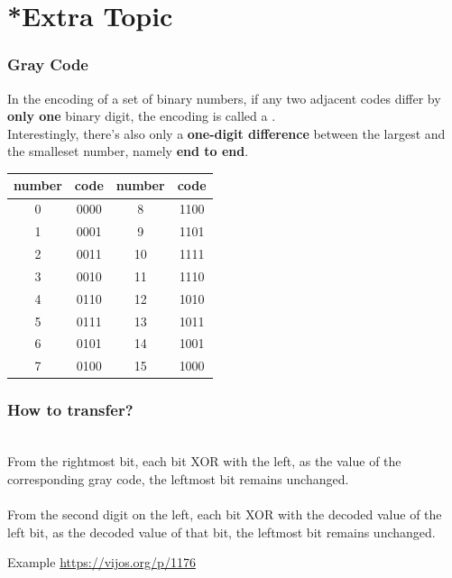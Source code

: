 \documentclass[xcolor=table]{beamer}
\begin{document}
\section{*Extra Topic}
\begin{frame}
    \frametitle{Gray Code}
    \hh
    In the encoding of a set of binary numbers, 
    if any two adjacent codes differ by \textbf{only one} binary digit, 
    the encoding is called a .\\
    \hh Interestingly, there's also only a \textbf{one-digit difference}
     between the largest and the smalleset number, namely \textbf{end to end}.
     \begin{table}[]
        \begin{tabular}{|c|c|c|c|}
        \toprule
        number & code & number & code \\ 
        \midrule
        0 & 0000 & 8 & 1100 \\ \hline
        1 & 0001 & 9 & 1101 \\ \hline
        2 & 0011 & 10 & 1111 \\ \hline
        3 & 0010 & 11 & 1110 \\ \hline
        4 & 0110 & 12 & 1010 \\ \hline
        5 & 0111 & 13 & 1011 \\ \hline
        6 & 0101 & 14 & 1001 \\ \hline
        7 & 0100 & 15 & 1000 \\ 
        \bottomrule
        \end{tabular}
        \end{table}
\end{frame}
\begin{frame}
    \frametitle{How to transfer?}
     \\
    \hh From the rightmost bit, each bit XOR with the left, as the value of the corresponding gray code, 
    the leftmost bit remains unchanged.
    \\
    \vv 
     \\
    \hh From the second digit on the left, each bit XOR with the decoded value of the left bit,
     as the decoded value of that bit, the leftmost bit remains unchanged.  
    \vv
     \begin{block}{Example}
        \hh \url{https://vijos.org/p/1176}
    \end{block}
\end{frame}
\end{document}
